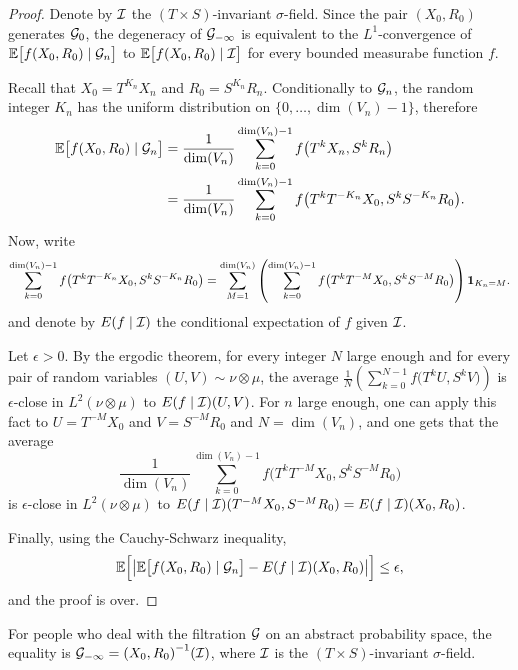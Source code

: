 \documentclass[12pt,a4paper]{article}
\begin{document}
\begin{proof}
Denote by $\mathcal{I}$ the $(T\times S)$-invariant $\sigma$-field. 
Since the pair $(X_0, R_0)$ generates $\mathcal{G}_0$, the degeneracy of $\mathcal{G}_{-\infty}$ 
is equivalent to the $L^1$-convergence of 
$\mathbb{E}\bigl[f(X_0, R_0) \mid \mathcal{G}_n\bigr]$ to $\mathbb{E}\bigl[f(X_0, R_0) \mid \mathcal{I}\bigr]$   
for every bounded measurabe function $f$. 

Recall that $X_{0} = T^{K_n}X_n$ and $R_{0} = S^{K_n}R_n$. 
Conditionally to $\mathcal{G}_n$, the random integer $K_n$ 
has the uniform distribution on $\bigl\{0, \ldots, \dim(V_n)-1\bigr\}$, 
therefore 
\begin{align*}
\mathbb{E}\bigl[f(X_0, R_0) \mid \mathcal{G}_n\bigr]
& =\frac{1}{\dim(V_n)}\sum_{k=0}^{\dim(V_n)-1} f\bigl(T^kX_n, S^kR_n \bigr) \\
& = \frac{1}{\dim(V_n)}\sum_{k=0}^{\dim(V_n)-1} f\bigl(T^{k}T^{-K_n}X_0, S^{k}S^{-K_n}R_0 \bigr).
\end{align*}
Now, write 
$$
\sum_{k=0}^{\dim(V_n)-1} f\bigl(T^{k}T^{-K_n}X_0, S^{k}S^{-K_n}R_0 \bigr) = 
\sum_{M=1}^{\dim(V_n)} \left(\sum_{k=0}^{\dim(V_n)-1} f\bigl(T^kT^{-M}X_0, S^kS^{-M}R_0 \bigr) \right)\boldsymbol 1_{K_n=M}.
$$
and denote by $E(f\mid\mathcal{I})$ the conditional expectation of $f$ given $\mathcal{I}$.

Let $\epsilon>0$. By the ergodic theorem, for every integer $N$ large enough and 
for every pair of random variables $(U,V) \sim \nu \otimes \mu$, the average 
$\frac{1}{N} \left(\sum_{k=0}^{N-1} f\bigl(T^k U, S^kV\bigr) \right)$ 
is $\epsilon$-close in $L^2(\nu \otimes \mu)$ to 
$E(f\mid\mathcal{I})(U,V)$. 
For $n$ large enough, one can apply this fact to $U=T^{-M}X_0$ and $V=S^{-M}R_0$ and 
$N=\dim(V_n)$, and one gets that the average 
$$
\frac{1}{\dim(V_n)}\sum_{k=0}^{\dim(V_n)-1} f\bigl(T^kT^{-M}X_0, S^kS^{-M}R_0 \bigr)
$$
is $\epsilon$-close in $L^2(\nu \otimes \mu)$ to 
$E(f\mid\mathcal{I})(T^{-M}X_0,S^{-M}R_0)=E(f\mid\mathcal{I})(X_0,R_0)$. 

Finally, using the Cauchy-Schwarz inequality,
$$
\mathbb{E}\Bigl[ \left| \mathbb{E}\bigl[f(X_0, R_0) \mid \mathcal{G}_n\bigr] - E(f\mid\mathcal{I})(X_0,R_0) \right| \Bigr] 
\leq \epsilon,
$$
and the proof is over.
\end{proof}

\begin{remark}
For people who deal with the filtration $\mathcal{G}$ on an abstract probability space, 
the equality is $\mathcal{G}_{-\infty} = {(X_0, R_0)}^{-1}(\mathcal{I})$, where $\mathcal{I}$ is 
the $(T\times S)$-invariant $\sigma$-field.
\end{remark}
\end{document}

